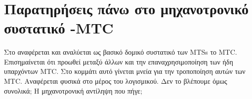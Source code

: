 \documentclass[a4paper,12pt,twoside]{article}
\begin{document}
	\tableofcontents
	
	\pagebreak
	
	\section{Παρατηρήσεις πάνω στο μηχανοτρονικό συστατικό -MTC}
		\paragraph{}{Στο \cite{TheMechatronicComponent:Thramboulidis2008} αναφέρεται και αναλύεται ως βασικό δομικό συστατικό των MTSs το MTC. Επισημαίνεται ότι προωθεί μεταξύ άλλων και την επαναχρησιμοποίηση των ήδη υπαρχόντων MTC. Στο κομμάτι αυτό γίνεται μνεία για την τροποποίηση αυτών των MTC. Αναφέρεται φυσικά στο μέρος του λογισμικού. Δεν το βλέπουμε όμως συνολικά; Η μηχανοτρονική αντίληψη που πήγε;
		}
		
		
		
	\cleardoublepage
	\label{κεφ.:Βιβλιογραφία}
	\printbibliography
\end{document}
